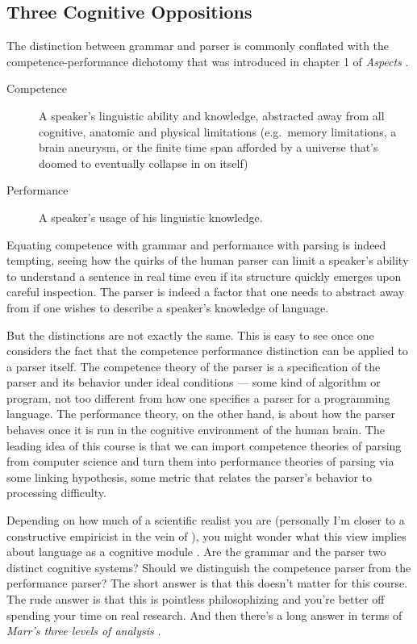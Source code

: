 \subsection{Three Cognitive Oppositions}
\label{sub:BigPicture_Oppositions}
The distinction between grammar and parser is commonly conflated with the competence-performance dichotomy that was introduced in chapter 1 of \emph{Aspects} \citep{Chomsky65}.
%
\begin{description}
    \item[Competence] A speaker's linguistic ability and knowledge, abstracted away from all cognitive, anatomic and physical limitations (e.g.\ memory limitations, a brain aneurysm, or the finite time span afforded by a universe that's doomed to eventually collapse in on itself)
    \item[Performance] A speaker's usage of his linguistic knowledge.
\end{description}
%
Equating competence with grammar and performance with parsing is indeed tempting, seeing how the quirks of the human parser can limit a speaker's ability to understand a sentence in real time even if its structure quickly emerges upon careful inspection.
The parser is indeed a factor that one needs to abstract away from if one wishes to describe a speaker's knowledge of language.

But the distinctions are not exactly the same.
This is easy to see once one considers the fact that the competence performance distinction can be applied to a parser itself.
The competence theory of the parser is a specification of the parser and its behavior under ideal conditions --- some kind of algorithm or program, not too different from how one specifies a parser for a programming language.
The performance theory, on the other hand, is about how the parser behaves once it is run in the cognitive environment of the human brain.
The leading idea of this course is that we can import competence theories of parsing from computer science and turn them into performance theories of parsing via some linking hypothesis, some metric that relates the parser's behavior to processing difficulty.

Depending on how much of a scientific realist you are (personally I'm closer to a constructive empiricist in the vein of \citealt{Fraassen80}), you might wonder what this view implies about language as a cognitive module \citep[cf.]{Chomsky86a, Fodor83}.
Are the grammar and the parser two distinct cognitive systems?
Should we distinguish the competence parser from the performance parser?
The short answer is that this doesn't matter for this course.
The rude answer is that this is pointless philosophizing and you're better off spending your time on real research.
And then there's a long answer in terms of \emph{Marr's three levels of analysis} \citep{MarrPoggio76}.

